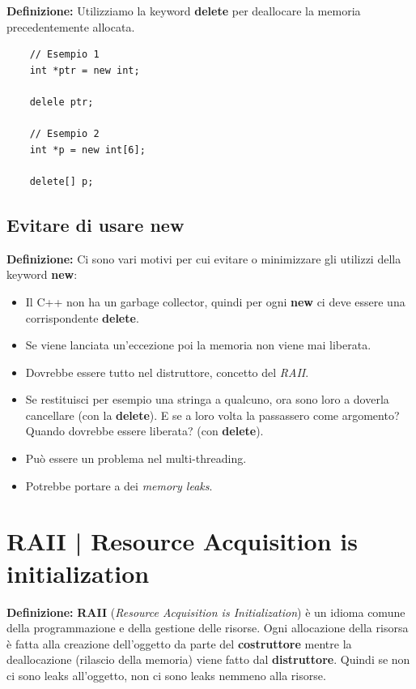 \textsf{\small \textbf{Definizione: } Utilizziamo la keyword \textbf{delete} per deallocare la memoria precedentemente allocata.} \\

\begin{lstlisting}
	// Esempio 1
	int *ptr = new int;
	
	delele ptr;
	
	// Esempio 2
	int *p = new int[6];
	
	delete[] p;
\end{lstlisting}

\subsection{Evitare di usare new}

\textsf{\small \textbf{Definizione: } Ci sono vari motivi per cui evitare o minimizzare gli utilizzi della keyword \textbf{new}: } \\

\begin{itemize}
	\item \textsf{\small Il C++ non ha un garbage collector, quindi per ogni \textbf{new} ci deve essere una corrispondente \textbf{delete}.}
	\item \textsf{\small Se viene lanciata un'eccezione poi la memoria non viene mai liberata.}
	\item \textsf{\small Dovrebbe essere tutto nel distruttore, concetto del \emph{RAII}.}
	\item \textsf{\small Se restituisci per esempio una stringa a qualcuno, ora sono loro a doverla cancellare (con la \textbf{delete}). E se a loro volta la passassero come argomento? Quando dovrebbe essere liberata? (con \textbf{delete}).}
	\item \textsf{\small Può essere un problema nel multi-threading.}
	\item \textsf{\small Potrebbe portare a dei \emph{memory leaks}.}
\end{itemize}


\section{RAII | Resource Acquisition is initialization}

\textsf{\small \textbf{Definizione: } \textbf{RAII} (\emph{Resource Acquisition is Initialization}) è un idioma comune della programmazione e della gestione delle risorse. Ogni allocazione della risorsa è fatta alla creazione dell'oggetto da parte del \textbf{costruttore} mentre la deallocazione (rilascio della memoria) viene fatto dal \textbf{distruttore}. Quindi se non ci sono leaks all'oggetto, non ci sono leaks nemmeno alla risorse. } \\

